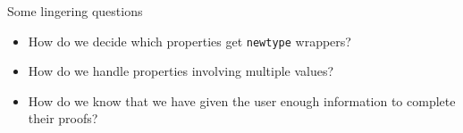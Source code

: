 \documentclass{beamer}
\begin{document}
\begin{frame}{}\end{frame}
\usebackgroundtemplate{}

\begin{frame}{Some lingering questions}

  \begin{itemize}
  \item How do we decide which properties get \texttt{newtype} wrappers?
  \bigskip

\item How do we handle properties involving multiple values?
  \bigskip
  
\item How do we know that we have given the user enough information to complete their proofs?
  \end{itemize}
\end{frame}
\end{document}
